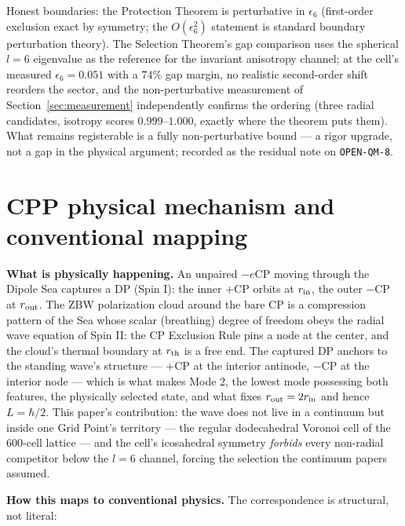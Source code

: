 \documentclass[12pt]{article}
\begin{document}
Honest boundaries: the Protection Theorem is perturbative in
$\epsilon_6$ (first-order exclusion exact by symmetry; the $O(\epsilon_6^2)$
statement is standard boundary perturbation theory).  The Selection
Theorem's gap comparison uses the spherical $l = 6$ eigenvalue as the
reference for the invariant anisotropy channel; at the cell's measured
$\epsilon_6 = 0.051$ with a $74\%$ gap margin, no realistic
second-order shift reorders the sector, and the non-perturbative
measurement of Section~\ref{sec:measurement} independently confirms
the ordering (three radial candidates, isotropy scores
$0.999$--$1.000$, exactly where the theorem puts them).  What remains
registerable is a fully non-perturbative bound --- a rigor upgrade,
not a gap in the physical argument; recorded as the residual note on
\texttt{OPEN-QM-8}.

\section{CPP physical mechanism and conventional mapping}
\label{sec:mechanism}

\textbf{What is physically happening.}  An unpaired $-e$CP moving
through the Dipole Sea captures a DP (Spin I): the inner $+$CP orbits at
$r_{\rm in}$, the outer $-$CP at $r_{\rm out}$.  The ZBW polarization
cloud around the bare CP is a compression pattern of the Sea whose
scalar (breathing) degree of freedom obeys the radial wave equation of
Spin II: the CP Exclusion Rule pins a node at the center, and the
cloud's thermal boundary at $r_{\rm th}$ is a free end.  The captured
DP anchors to the standing wave's structure --- $+$CP at the interior
antinode, $-$CP at the interior node --- which is what makes Mode 2,
the lowest mode possessing both features, the physically selected
state, and what fixes $r_{\rm out} = 2 r_{\rm in}$ and hence
$L = \hbar/2$.  This paper's contribution: the wave does not live in a
continuum but inside one Grid Point's territory --- the regular
dodecahedral Voronoi cell of the 600-cell lattice --- and the cell's
icosahedral symmetry \emph{forbids} every non-radial competitor below
the $l = 6$ channel, forcing the selection the continuum papers
assumed.

\textbf{How this maps to conventional physics.}  The correspondence is
structural, not literal:
\end{document}
